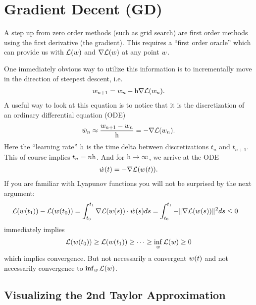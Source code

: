 
\chapter{Gradient Decent (GD)}

A step up from zero order methods (such as grid search) are first order methods
using the first derivative (the gradient). This requires a ``first order oracle''
which can provide us with \(\mathcal{L}(w)\) and \(\nabla \mathcal{L}(w)\) at any point
\(w\).

One immediately obvious way to utilize this information is to
incrementally move in the direction of steepest descent, i.e.
%
\begin{align*}
	w_{n+1} = w_n - \text{h}\nabla \mathcal{L}(w_n).
\end{align*}
%
A useful way to look at this equation is to notice that it is the
discretization of an ordinary differential equation (ODE)
%
\begin{align*}
	\dot{w}_n \approx \frac{w_{n+1} - w_n}{\text{h}}
	= - \nabla \mathcal{L}(w_n).
\end{align*}
%
Here the ``learning rate'' \(\text{h}\) is the time delta between discretizations
\(t_n\) and \(t_{n+1}\). This of course implies \(t_n = n\text{h}\). And for
\(\text{h}\to\infty\), we arrive at the ODE
%
\begin{align}\label{eq: velocity is gradient}
	\dot{w}(t) = -\nabla \mathcal{L}(w(t)).
\end{align}
%
If you are familiar with Lyapunov functions you will not be surprised by the next
argument:
%
\begin{align}\label{eq: gradient integral}
	\mathcal{L}(w(t_1)) - \mathcal{L}(w(t_0))
	&= \int_{t_0}^{t_1} \nabla \mathcal{L}(w(s)) \cdot \dot{w}(s) ds
	= \int_{t_0}^{t_1} -\|\nabla \mathcal{L}(w(s))\|^2 ds
	\le 0
\end{align}
%
immediately implies
\begin{align*}
	\mathcal{L}(w(t_0)) \ge \mathcal{L}(w(t_1)) \ge \dots \ge \inf_w \mathcal{L}(w) \ge 0
\end{align*}
which implies convergence. But not necessarily a convergent \(w(t)\) and
not necessarily convergence to \(\inf_w \mathcal{L}(w)\).

\section{Visualizing the 2nd Taylor Approximation}\label{sec: visualize gd}

